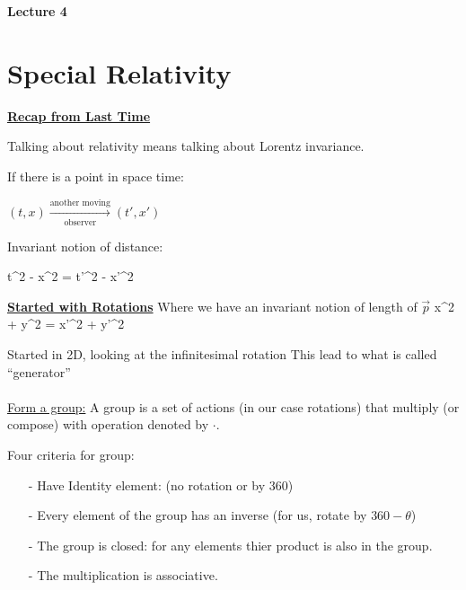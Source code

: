 
\usepackage{fancyhdr}

\fancyhf{}


\thispagestyle{fancy}

\begin{center}
{\huge \textbf{Lecture 4}}
\end{center}

{\fontsize{14}{16}\selectfont


\section*{Special Relativity}

\underline{\textbf{Recap from Last Time}}

Talking about relativity means talking about Lorentz invariance.

If there is a point in space time: \\
\begin{center}
$(t,x) \xrightarrow[\text{observer}]{\text{another moving}} (t', x')$
\end{center}

Invariant notion of distance:
 
\be
t^2 - x^2 = t'^2 - x'^2
\ee

\underline{\textbf{Started with Rotations}}
Where we have an invariant notion of length of $\vec{p}$
\be
x^2 + y^2 = x'^2 + y'^2
\ee

Started in 2D, looking at the infinitesimal rotation
This lead to what is called ``generator'' \\

\IMatrix\\

\underline{Form a group:}
A group is a set of actions (in our case rotations) that multiply (or compose) with operation denoted by $\cdot$.

Four criteria for group:
\begin{itemize}
\item[-] Have Identity element:  (no rotation or by 360)
\item[-] Every element of the group has an inverse (for us, rotate by $360-\theta$)
\item[-] The group is closed:  for any elements thier product is also in the group.
\item[-] The multiplication is associative.
\end{itemize}

}
